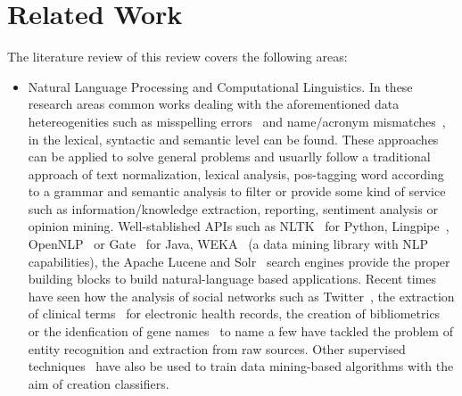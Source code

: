 \documentclass{llncs}
\begin{document}
\section{Related Work}
The literature review of this review covers the following areas:
\begin{itemize}
 \item Natural Language Processing and Computational Linguistics. In these research areas common works dealing with the aforementioned data hetereogenities 
   such as misspelling errors~\cite{NorvigSpelling,StanfordSpelling} and name/acronym mismatches~\cite{Yeates99automaticextraction,Ratinov:2004:AES:1025132.1026366}, 
  in the lexical, syntactic and semantic level can be found. These approaches can be applied to solve general problems and usuarlly follow a 
  traditional approach of text normalization, lexical analysis, pos-tagging word according to a grammar and semantic analysis to filter or 
  provide some kind of service such as information/knowledge extraction, reporting, sentiment analysis or opinion mining. 
  Well-stablished APIs such as NLTK~\cite{LoperBird02} for Python, Lingpipe~\cite{Lingpipe}, OpenNLP~\cite{OpenNLP} or Gate~\cite{Gate} for Java, WEKA~\cite{read12:_scalab,} 
  (a data mining library with NLP capabilities), the Apache Lucene and Solr~\cite{rafa2011apache} search engines provide the proper building blocks to build natural-language based applications. Recent times have seen how the analysis 
  of social networks such as Twitter~\cite{Li:2012:TNE:2348283.2348380,Gimpel:2011:PTT:2002736.2002747}, the extraction of 
  clinical terms~\cite{Wang:2009:ARN:1667884.1667888} for electronic health records, the creation of bibliometrics~\cite{Galvez2006,Morillo:2013:TAA:2424697.2424727} or 
  the idenfication of gene names~\cite{Krauthammer:2004:TIB:1053007.1053018,Galvez2012} to name a few have tackled the problem of entity recognition and extraction from raw sources. 
  Other supervised techniques~\cite{Bohn:2006:PHD} have also be used to train data mining-based algorithms with the aim of creation 
  classifiers.
 

\end{itemize}
\end{document}
